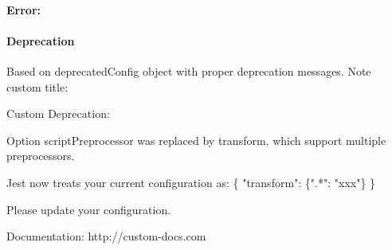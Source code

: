 \paragraph*{Error\+:}




\paragraph*{Deprecation}

Based on {\ttfamily deprecated\+Config} object with proper deprecation messages. Note custom title\+:


\begin{DoxyCode}
Custom Deprecation:

  Option scriptPreprocessor was replaced by transform, which support multiple preprocessors.

  Jest now treats your current configuration as:
  \{
    "transform": \{".*": "xxx"\}
  \}

  Please update your configuration.

  Documentation: http://custom-docs.com
\end{DoxyCode}
 